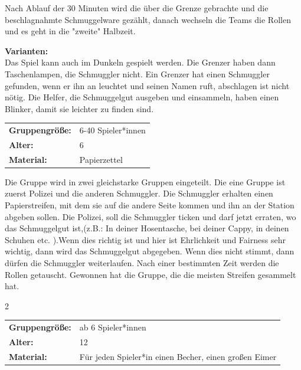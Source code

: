 Nach Ablauf der 30 Minuten wird die über die Grenze gebrachte und die beschlagnahmte Schmuggelware gezählt, danach wechseln die Teams die Rollen und es geht in die "zweite" Halbzeit.

\textbf{Varianten:}\\
Das Spiel kann auch im Dunkeln gespielt werden. Die Grenzer haben dann Taschenlampen, die Schmuggler nicht. Ein Grenzer hat einen Schmuggler gefunden, wenn er ihn an leuchtet und seinen Namen ruft, abschlagen ist nicht nötig. Die Helfer, die Schmuggelgut ausgeben und einsammeln, haben einen Blinker, damit sie leichter zu finden sind.


\begin{table}[H]
\begin{tabular}{>{\bfseries}lp{8cm}}
   Gruppengröße:   & 6-40 Spieler*innen\\
    Alter: & 6 \\
    Material: & Papierzettel \\ 
\end{tabular}
\end{table} 

Die Gruppe wird in zwei gleichstarke Gruppen eingeteilt. Die eine Gruppe ist zuerst Polizei und die anderen Schmuggler. Die Schmuggler erhalten einen Papierstreifen, mit dem sie auf die andere Seite kommen und ihn an der Station abgeben sollen. Die Polizei, soll die Schmuggler ticken und darf jetzt erraten, wo das Schmuggelgut ist,(z.B.: In deiner Hosentasche, bei deiner Cappy, in deinen Schuhen etc. ).Wenn dies richtig ist und hier ist Ehrlichkeit und Fairness sehr wichtig, dann wird das Schmuggelgut abgegeben.  Wenn dies nicht stimmt, dann dürfen die Schmuggler weiterlaufen. Nach einer bestimmten Zeit werden die Rollen getauscht. Gewonnen hat die Gruppe, die die meisten Streifen gesammelt hat.

2
\begin{table}[H]
\begin{tabular}{>{\bfseries}lp{8cm}}
   Gruppengröße:   & ab 6 Spieler*innen\\
    Alter: & 12 \\
    Material: & Für jeden Spieler*in einen Becher, einen großen Eimer \\ 
\end{tabular}
\end{table} 

